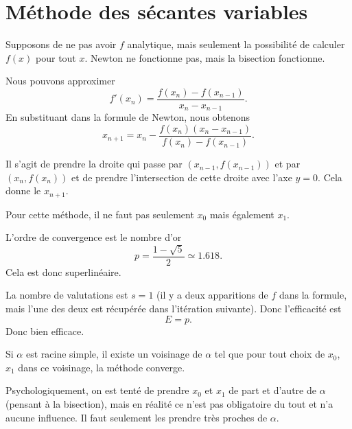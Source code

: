 \section{Méthode des sécantes variables}
\label{SECooIUEUooVcHAoc}

Supposons de ne pas avoir \( f\) analytique, mais seulement la possibilité de calculer \( f(x)\) pour tout \( x\). Newton ne fonctionne pas, mais la bisection fonctionne.

Nous pouvons approximer
\begin{equation}
    f'(x_n)=\frac{ f(x_n)-f(x_{n-1}) }{ x_n-x_{n-1} }.
\end{equation}
En substituant dans la formule de Newton, nous obtenons
\begin{equation}
    x_{n+1}=x_n-\frac{ f(x_n)(x_n-x_{n-1}) }{ f(x_n)-f(x_{n-1}) }.
\end{equation}

Il s'agit de prendre la droite qui passe par \( (x_{n-1},f(x_{n-1}))\) et par \( (x_n,f(x_n))\) et de prendre l'intersection de cette droite avec l'axe \( y=0\). Cela donne le \( x_{n+1}\).

Pour cette méthode, il ne faut pas seulement \( x_0\) mais également \( x_1\).

L'ordre de convergence est le nombre d'or
\begin{equation}    \label{EQooQEFCooUsGVjP}
    p=\frac{ 1-\sqrt{ 5 } }{ 2 }\simeq 1.618.
\end{equation}
Cela est donc superlinéaire.

La nombre de valutations est \( s=1\) (il y a deux apparitions de \( f\) dans la formule, mais l'une des deux est récupérée dans l'itération suivante). Donc l'efficacité est
\begin{equation}
    E=p.
\end{equation}
Donc bien efficace.

\begin{proposition}
    Si \( \alpha\) est racine simple, il existe un voisinage de \( \alpha\) tel que pour tout choix de \( x_0\), \( x_1\) dans ce voisinage, la méthode converge.
\end{proposition}

Psychologiquement, on est tenté de prendre \( x_0\) et \( x_1\) de part et d'autre de \( \alpha\) (pensant à la bisection), mais en réalité ce n'est pas obligatoire du tout et n'a aucune influence. Il faut seulement les prendre très proches de \( \alpha\).

